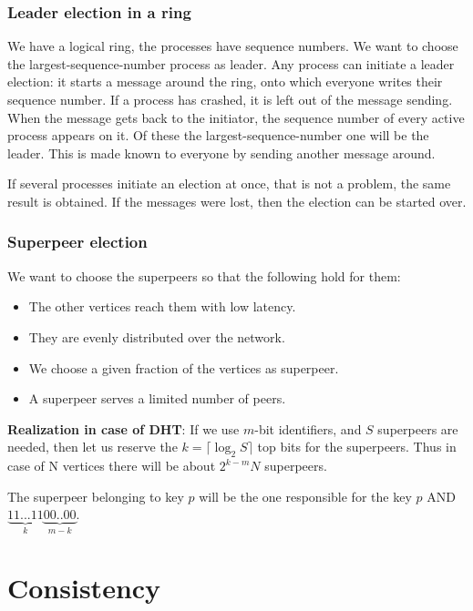 \documentclass[margin=0px]{article}
\begin{document}
\subsubsection{Leader election in a ring}

We have a logical ring, the processes have sequence numbers. We want to choose the largest-sequence-number process as leader.
Any process can initiate a leader election: it starts a message around the ring, onto which everyone writes
their sequence number. If a process has crashed, it is left out of the message sending. When the message gets back to the initiator,
the sequence number of every active process appears on it. Of these the largest-sequence-number one will be the leader. This is made
known to everyone by sending another message around.

If several processes initiate an election at once, that is not a problem, the same result is obtained. If the messages
were lost, then the election can be started over.

\subsubsection{Superpeer election}

We want to choose the superpeers so that the following hold for them:

\begin{itemize}
    \item	The other vertices reach them with low latency.
    \item	They are evenly distributed over the network.
    \item	We choose a given fraction of the vertices as superpeer.
    \item	A superpeer serves a limited number of peers.
\end{itemize}

\noindent \textbf{Realization in case of DHT}: If we use $m$-bit identifiers, and $S$ superpeers are needed, then
let us reserve the $k= \lceil \log_{2} S \rceil$ top bits for the superpeers. Thus in case of N vertices there will be about $2^{k-m}N$
superpeers.

The superpeer belonging to key $p$ will be the one responsible for the key $p$ AND $\underbrace{11...11}_{k}\underbrace{00..00}_{m-k}$.

\section{Consistency}
\end{document}
